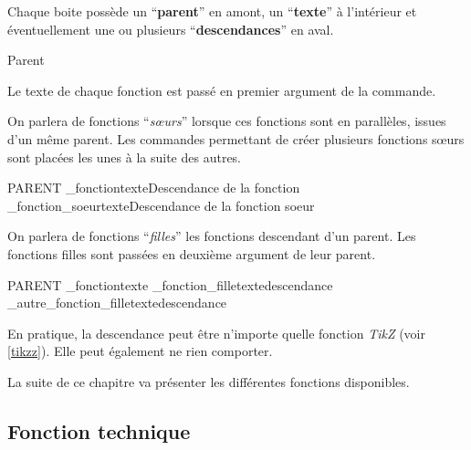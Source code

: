 		Chaque boite possède un ``\textbf{parent}'' en amont, un ``\textbf{texte}'' à l'intérieur et éventuellement une ou plusieurs ``\textbf{descendances}'' en aval.

		\begin{center}
			\begin{fast}{Parent}
			\end{fast}
		\end{center}
		

		Le texte de chaque fonction est passé en premier argument de la commande.

		On parlera de fonctions ``\emph{s\oe urs}'' lorsque ces fonctions sont en parallèles, issues d'un même parent.
		Les commandes permettant de créer plusieurs fonctions s\oe urs sont placées les unes à la suite des autres.

\begin{code}
\begin{fast}{PARENT}
	\une_fonction{texte}{Descendance de la fonction}
	\une_fonction_soeur{texte}{Descendance de la fonction soeur}
\end{fast}
\end{code}

		On parlera de fonctions ``\emph{filles}'' les fonctions descendant d'un parent.
		Les fonctions filles sont passées en deuxième argument de leur parent.

\begin{code}
\begin{fast}{PARENT}
	\une_fonction{texte}{
				\une_fonction_fille{texte}{descendance}
				\une_autre_fonction_fille{texte}{descendance}
			}
\end{fast}
\end{code}

	En pratique, la descendance peut être n'importe quelle fonction \emph{TikZ} (voir \ref{tikzz}).
	Elle peut également ne rien comporter.

	La suite de ce chapitre va présenter les différentes fonctions disponibles.




	\subsection{Fonction technique}\label{FT}

